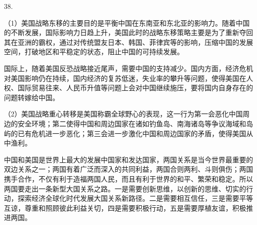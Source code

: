 \documentclass[a4paper]{article}
\begin{document}
38.

（1）美国战略东移的主要目的是平衡中国在东南亚和东北亚的影响力。随着中国的不断发展，国际影响力日趋上升，美国此时的战略东移策略主要是为了重新夺回其在亚洲的霸权，通过对传统盟友日本、韩国、菲律宾等的影响，压缩中国的发展空间，打破地区和平稳定的状态，阻止中国的可持续发展。

国际上，随着美国反恐战略接近尾声，需要中国的支持减少。国内方面，经济危机对美国影响仍在持续，国内经济的复苏低迷，失业率的攀升等问题，使得美国在人权、国际贸易往来、人民币升值等问题上会对中国继续施压，要将国内自身存在的问题转嫁给中国。

（2）美国战略重心转移是美国称霸全球野心的表现，这一行为第一会恶化中国周边的安全环境；第二使得中国和周边国家在诸如钓鱼岛、南海诸岛等争议海域和岛屿的已有危机进一步恶化；第三会进一步激化中国和周边国家的矛盾，使得美国从中渔利。

中国和美国是世界上最大的发展中国家和发达国家，两国关系是当今世界最重要的双边关系之一；两国有着广泛而深入的共同利益，两国合则两利、斗则俱伤；两国携手合作，不仅有利于造福两国人民，而且有利于世界的和平、繁荣和稳定。所以两国要走出一条新型大国关系之路。一是需要创新思维，以创新的思维、切实的行动，探索经济全球化时代发展大国关系新路径。二是需要相互信任，三是需要平等互谅，尊重和照顾彼此利益关切，四是需要积极行动，五是需要厚植友谊，积极推进两国。
\end{document}
